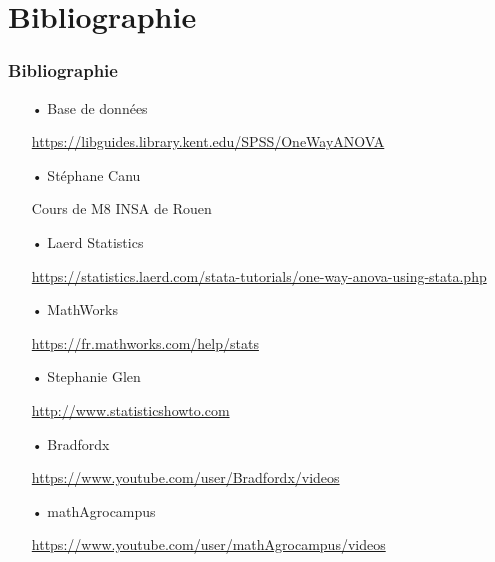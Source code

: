 \documentclass{beamer}
\begin{document}
\section{Bibliographie}
\begin{frame}
	\frametitle{Bibliographie}
\begin{itemize}
\item[•] Base de données
\item[] \url{https://libguides.library.kent.edu/SPSS/OneWayANOVA}
\item[•] Stéphane Canu
\item[] \color{blue} Cours de M8 INSA de Rouen
\item[•] \color{black} Laerd Statistics
\item[] \url{https://statistics.laerd.com/stata-tutorials/one-way-anova-using-stata.php}
\item[•] MathWorks
\item[] \url{https://fr.mathworks.com/help/stats}
\item[•] Stephanie Glen
\item[] \url{http://www.statisticshowto.com}
\item[•] Bradfordx
\item[] \url{https://www.youtube.com/user/Bradfordx/videos}
\item[•] mathAgrocampus
\item[] \url{https://www.youtube.com/user/mathAgrocampus/videos}
\end{itemize}
\end{frame}
\end{document}
